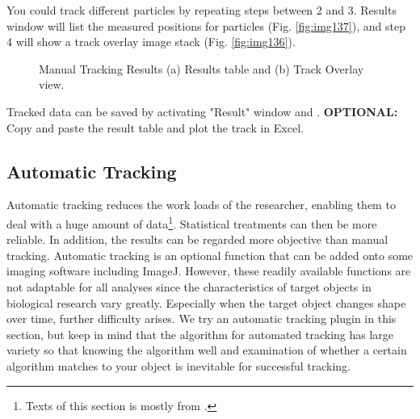 \begin{indentexercise}{1}
You could track different particles by repeating steps between 2 and 3. Results window will list the measured positions for particles (Fig. \ref{fig:img137}), and step 4 will show a track overlay image stack (Fig. \ref{fig:img136}).  

\begin{figure}[htbp]
\centering
{}
\caption{ Manual Tracking Results (a) Results table and (b) Track Overlay view.}
\label{fig:ManualTrackResults}
\end{figure} 

Tracked data can be saved by activating "Result" window and .  \textbf{OPTIONAL:} Copy and paste the result table and plot the track in Excel.
\end{indentexercise}

\subsection{Automatic Tracking}
\label{subsubsec:autotracker}

Automatic tracking reduces the work loads of the researcher, enabling
them to deal with a huge amount of data\footnote{ Texts of this section is mostly from \citep{MiuraME2005}.}. Statistical treatments can
then be more reliable. In addition, the results can be regarded more
objective than manual tracking. Automatic tracking is an optional
function that can be added onto some imaging software including ImageJ. However,
these readily available functions are not adaptable for all analyses since
the characteristics of target objects in biological research vary
greatly. Especially when the target object changes shape over time,
further difficulty arises. We try an automatic tracking plugin in this section,
but keep in mind that the algorithm for automated tracking has large variety
so that knowing the algorithm well and examination of whether a certain
algorithm matches to your object is inevitable for successful tracking.

